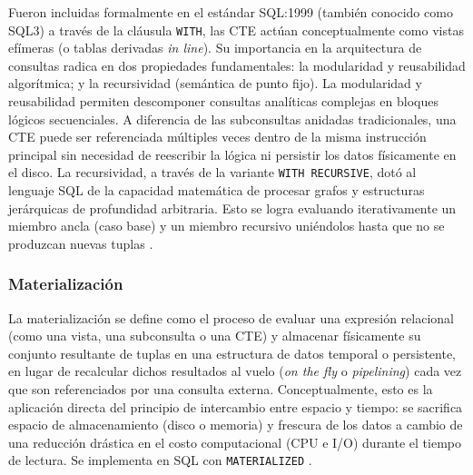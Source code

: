 \documentclass[12pt, letter paper]{report}
\begin{document}
        Fueron incluidas formalmente en el estándar SQL:1999 (también conocido
        como SQL3) a través de la cláusula \texttt{WITH}, las CTE actúan
        conceptualmente como vistas efímeras (o tablas derivadas \textit{in
        line}). Su importancia en la arquitectura de consultas radica en dos
        propiedades fundamentales: la modularidad y reusabilidad algorítmica; y
        la recursividad (semántica de punto fijo). La modularidad y reusabilidad
        permiten descomponer consultas analíticas complejas en bloques lógicos
        secuenciales. A diferencia de las subconsultas anidadas tradicionales,
        una CTE puede ser referenciada múltiples veces dentro de la misma
        instrucción principal sin necesidad de reescribir la lógica ni persistir
        los datos físicamente en el disco. La recursividad, a través de la
        variante \texttt{WITH RECURSIVE}, dotó al lenguaje SQL de la capacidad
        matemática de procesar grafos y estructuras jerárquicas de profundidad
        arbitraria. Esto se logra evaluando iterativamente un miembro ancla
        (caso base) y un miembro recursivo uniéndolos hasta que no se produzcan
        nuevas tuplas \cite{silberschatz2010database}.

        \subsubsection{Materialización} %
        \label{ssub:materialización}
          La materialización se define como el proceso de evaluar una expresión
          relacional (como una vista, una subconsulta o una CTE) y almacenar
          físicamente su conjunto resultante de tuplas en una estructura de
          datos temporal o persistente, en lugar de recalcular dichos resultados
          al vuelo (\textit{on the fly} o \textit{pipelining}) cada vez que son
          referenciados por una consulta externa. Conceptualmente, esto es la
          aplicación directa del principio de intercambio entre espacio y
          tiempo: se sacrifica espacio de almacenamiento (disco o memoria) y
          frescura de los datos a cambio de una reducción drástica en el costo
          computacional (CPU e I/O) durante el tiempo de lectura. Se implementa
          en SQL con \texttt{MATERIALIZED} \cite{ramakrishnan2003database}.
\end{document}
